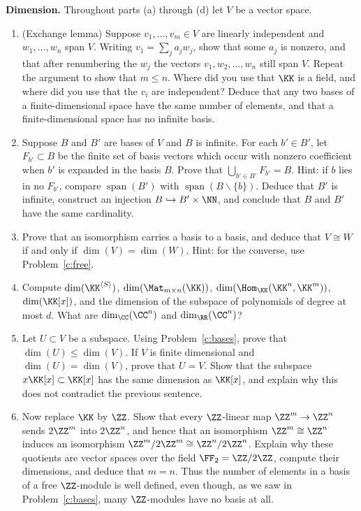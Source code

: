 \documentclass[12pt,reqno]{amsart}
\begin{document}
\hrulefill

\begin{problems}
\item\label{c:dimension} \textbf{Dimension.} Throughout parts (a) through (d) let $V$ be a vector space.
\begin{enumerate}
\item (Exchange lemma) Suppose $v_1,\ldots,v_m\in V$ are linearly independent and $w_1,\ldots,w_n$ span $V$. Writing $v_1=\sum_ja_jw_j$, show that some $a_j$ is nonzero, and that after renumbering the $w_j$ the vectors $v_1,w_2,\ldots,w_n$ still span $V$. Repeat the argument to show that $m\leq n$. Where did you use that $\KK$ is a field, and where did you use that the $v_i$ are independent? Deduce that any two bases of a finite-dimensional space have the same number of elements, and that a finite-dimensional space has no infinite basis.
\item Suppose $B$ and $B'$ are bases of $V$ and $B$ is infinite. For each $b'\in B'$, let $F_{b'}\subset B$ be the finite set of basis vectors which occur with nonzero coefficient when $b'$ is expanded in the basis $B$. Prove that $\bigcup_{b'\in B'}F_{b'}=B$. Hint: if $b$ lies in no $F_{b'}$, compare $\operatorname{span}(B')$ with $\operatorname{span}(B\smallsetminus\{b\})$. Deduce that $B'$ is infinite, construct an injection $B\hookrightarrow B'\times\NN$, and conclude that $B$ and $B'$ have the same cardinality.
\item Prove that an isomorphism carries a basis to a basis, and deduce that $V\cong W$ if and only if $\dim(V)=\dim(W)$. Hint: for the converse, use Problem~\ref{c:free}. 
\item Compute $\dim(\KK^{\langle S\rangle})$, $\dim(\Mat_{m\times n}(\KK))$, $\dim(\Hom_{\KK}(\KK^n,\KK^m))$, $\dim(\KK[x])$, and the dimension of the subspace of polynomials of degree at most $d$. What are $\dim_{\CC}(\CC^n)$ and $\dim_{\RR}(\CC^n)$?
\item Let $U\subset V$ be a subspace. Using Problem~\ref{c:bases}, prove that $\dim(U)\leq\dim(V)$. If $V$ is finite dimensional and $\dim(U)=\dim(V)$, prove that $U=V$. Show that the subspace $x\KK[x]\subset\KK[x]$ has the same dimension as $\KK[x]$, and explain why this does not contradict the previous sentence.
\item Now replace $\KK$ by $\ZZ$. Show that every $\ZZ$-linear map $\ZZ^m\to\ZZ^n$ sends $2\ZZ^m$ into $2\ZZ^n$, and hence that an isomorphism $\ZZ^m\cong\ZZ^n$ induces an isomorphism $\ZZ^m/2\ZZ^m\cong\ZZ^n/2\ZZ^n$. Explain why these quotients are vector spaces over the field $\FF_2=\ZZ/2\ZZ$, compute their dimensions, and deduce that $m=n$. Thus the number of elements in a basis of a free $\ZZ$-module is well defined, even though, as we saw in Problem~\ref{c:bases}, many $\ZZ$-modules have no basis at all.
\end{enumerate}
\end{problems}
\end{document}
